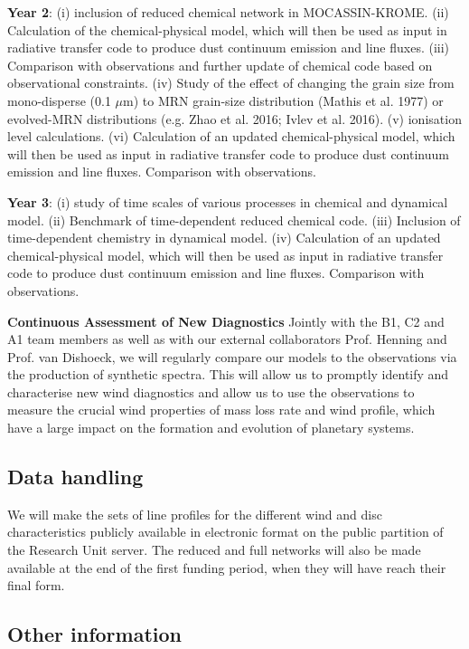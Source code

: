 \documentclass[10pt,fleqn,twoside]{article}
\newcommand{\Tcol}{\color{blue}}
\begin{document}
{\Tcol\bf Year 2}: (i) inclusion of reduced chemical network in MOCASSIN-KROME. (ii) Calculation of the chemical-physical model, which will then be used as input in radiative transfer code to produce dust continuum emission and line fluxes. (iii) Comparison with observations and further update of chemical code based on observational constraints. (iv) Study of the effect of changing the grain size from mono-disperse (0.1 $\mu$m) to MRN grain-size distribution (Mathis et al. 1977) or evolved-MRN distributions (e.g. Zhao et al. 2016; Ivlev et al. 2016). (v) ionisation level calculations. (vi)  Calculation of an updated chemical-physical model, which will then be used as input in radiative transfer code to produce dust continuum emission and line fluxes. Comparison with observations.

{\Tcol\bf Year 3}: (i) study of time scales of various processes in chemical and dynamical model. (ii) Benchmark of time-dependent reduced chemical code. (iii) Inclusion of time-dependent chemistry in dynamical model. (iv)  Calculation of an updated chemical-physical model, which will then be used as input in radiative transfer code to produce dust continuum emission and line fluxes. Comparison with observations.

{\Tcol\bf Continuous Assessment of New Diagnostics} Jointly with the B1, C2 and A1 team members as well as with our external collaborators Prof. Henning and Prof. van Dishoeck, we will regularly compare our models to the observations via the production of synthetic spectra. This will allow us to promptly identify and characterise new wind diagnostics and allow us to use the observations to measure the crucial wind properties of mass loss rate and wind profile, which have a large impact on the formation and evolution of planetary systems. 

\subsection{\Tcol Data handling}
We will make the sets of line profiles for the different wind and disc characteristics publicly available in electronic format on the public partition of the Research Unit server. The reduced and full networks will also be made available at the end of the first funding period, when they will have reach their final form. 

\subsection{\Tcol Other information}
\end{document}
